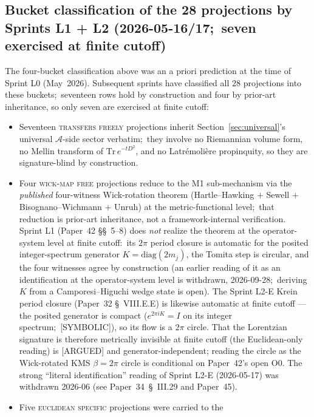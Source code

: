 \documentclass[twocolumn,pra,amsmath,amssymb,superscriptaddress]{revtex4-2}
\begin{document}
\subsection{Bucket classification of the 28 projections by Sprints L1 + L2
(2026-05-16/17;\ seven exercised at finite cutoff)}
\label{sec:sig_l2_verification}

The four-bucket classification above was an a priori prediction at
the time of Sprint L0 (May~2026).  Subsequent sprints have classified
all $28$ projections into these buckets;\ seventeen rows hold by
construction and four by prior-art inheritance, so only seven are
exercised at finite cutoff:

\begin{itemize}\setlength{\itemsep}{2pt}
\item Seventeen \textsc{transfers freely} projections inherit
Section~\ref{sec:universal}'s universal $\mathcal{A}$-side sector
verbatim;\ they involve no Riemannian volume form, no Mellin transform
of $\mathrm{Tr}\,e^{-tD^2}$, and no Latr\'emoli\`ere propinquity, so
they are signature-blind by construction.
\item Four \textsc{wick-map free} projections reduce to the M1
sub-mechanism via the \emph{published} four-witness Wick-rotation
theorem (Hartle--Hawking $+$ Sewell $+$ Bisognano--Wichmann $+$
Unruh) at the metric-functional level;\ that reduction is prior-art
inheritance, not a framework-internal verification.  Sprint L1
(Paper~42 \S\S~5--8) does \emph{not} realize the theorem at the
operator-system level at finite cutoff:\ its $2\pi$ period closure is
automatic for the posited integer-spectrum generator
$K = \mathrm{diag}(2m_j)$, the Tomita step is circular, and the
four witnesses agree by construction (an earlier reading of it as an
identification at the operator-system level is withdrawn, 2026-09-28;\
deriving $K$ from a Camporesi--Higuchi wedge state is open).  The
Sprint L2-E Krein period closure
(Paper~32 \S~VIII.E.E) is likewise automatic at finite cutoff ---
the posited generator is compact ($e^{2\pi i K}=I$ on its integer
spectrum;\ [SYMBOLIC]), so its flow is a $2\pi$ circle.  That the
Lorentzian signature is therefore metrically invisible at finite cutoff
(the Euclidean-only reading) is [ARGUED] and generator-independent;
reading the circle as the Wick-rotated KMS $\beta = 2\pi$ circle is
conditional on Paper~42's open O0.  The strong ``literal
identification'' reading of Sprint L2-E (2026-05-17) was withdrawn
2026-06 (see Paper~34~\S~III.29 and Paper~45).
\item Five \textsc{euclidean specific} projections were carried to the

\end{itemize}
\end{document}

